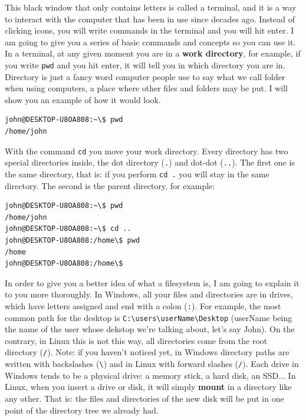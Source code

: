 \documentclass[a4paper]{article}
\begin{document}
This black window that only contains letters is called a terminal, and it is
a way to interact with the computer that has been in use since decades ago.
Instead of clicking icons, you will write commands in the terminal and you
will hit enter. I am going to give you a series of basic commands and
concepts so you can use it. In a terminal, at any given moment you are in a
\textbf{work directory}, for example, if you write \verb!pwd! and you hit enter,
it will tell you in which directory you are in. Directory is just a fancy word
computer people use to say what we call folder when using computers, a place
where other files and folders may be put.
I will show you an example of how it would look.

\noindent
\begin{minipage}[H]{\linewidth}
\mbox{}
\begin{lstlisting}[style=terminalStyle]
john@DESKTOP-U8OA808:~\$ pwd
/home/john
\end{lstlisting}
\end{minipage}

With the command \verb!cd! you move your work directory. Every directory has two
special directories inside, the dot directory (\verb!.!) and dot-dot
(\verb!..!). The first one is the same directory, that is: if you perform
\verb!cd .! you will stay in the same directory. The second is the parent
directory, for example:

\noindent
\begin{minipage}[H]{\linewidth}
\mbox{}
\begin{lstlisting}[style=terminalStyle]
john@DESKTOP-U8OA808:~\$ pwd
/home/john
john@DESKTOP-U8OA808:~\$ cd ..
john@DESKTOP-U8OA808:/home\$ pwd
/home
john@DESKTOP-U8OA808:/home\$
\end{lstlisting}
\end{minipage}

In order to give you a better idea of what a filesystem is, I am going to
explain it to you more thoroughly. In Windows, all your files and directories
are in drives, which have letters assigned and end with a colon (\verb!:!).
For example, the most common path for the desktop is
\verb!C:\users\userName\Desktop! (userName being the name of the user whose
dekstop we're talking about, let's say John). On the contrary, in Linux this is
not this way, all directories come from the root directory (\verb!/!). Note: if
you haven't noticed yet, in Windows directory paths are written with backslashes
(\verb!\!) and in Linux with forward slashes (\verb!/!). Each drive in Windows
tends to be a physical drive: a memory stick, a hard disk, an SSD... In Linux,
when you insert a drive or disk, it will simply \textbf{mount} in a directory
like any other. That is: the files and directories of the new disk will be put
in one point of the directory tree we already had.
\end{document}
